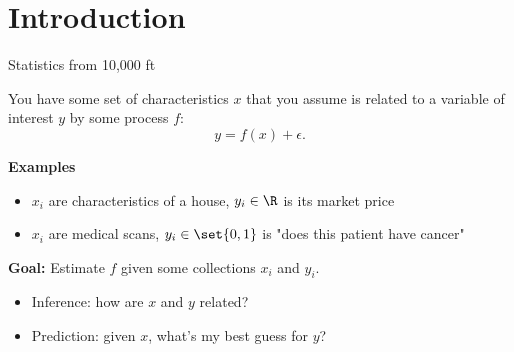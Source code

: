 \section{Introduction}

\begin{frame}{Statistics from 10,000 ft}

	You have some set of characteristics $x$ that you assume is related to a variable of interest $y$ by some process $f$:
	\begin{equation*}
		y = f(x) + \epsilon.
	\end{equation*}

	\pause \bigskip

	\textbf{Examples}

	\begin{itemize}[<+->]
		\item ${x_i}$ are characteristics of a house, ${y_i} \in \R$ is its market price
		\item ${x_i}$ are medical scans, ${y_i} \in \set{0, 1}$ is "does this patient have cancer"
	\end{itemize}

	\pause \bigskip

	\textbf{Goal:} Estimate $f$ given some collections ${x_i}$ and ${y_i}$.

	\pause

	\begin{itemize}[<+->]
		\item Inference: how are $x$ and $y$ related?
		\item Prediction: given $x$, what's my best guess for $y$?
	\end{itemize}
\end{frame}

